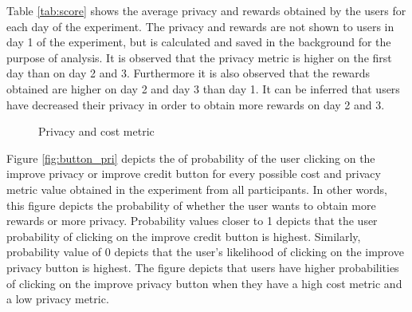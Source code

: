 Table \ref{tab:score} shows the average privacy and rewards obtained by the users for each day of the experiment. The privacy and rewards are not shown to users in day 1 of the experiment, but is calculated and saved in the background for the purpose of analysis. It is observed that the privacy metric is higher on the first day than on day 2 and 3. Furthermore it is also observed that the rewards obtained are higher on day 2 and day 3 than day 1.
It can be inferred that users have decreased their privacy in order to obtain more rewards on day 2 and 3.

\begin{figure}[htp]
\hspace{1em}
\caption{Privacy and cost metric}
\label{fig:st3}
\end{figure}

Figure \ref{fig:button_pri} depicts the of probability of the user clicking on the improve privacy or improve credit button for every possible cost and privacy metric value obtained in the experiment from all participants. In other words, this figure depicts the probability of whether the user wants to obtain more rewards or more privacy. Probability values closer to 1 depicts that the user probability of clicking on the improve credit button is highest. Similarly, probability value of 0 depicts that the user's likelihood of clicking on the improve privacy button is highest. The figure depicts that users have higher probabilities of clicking on the improve privacy button when they have a high cost metric and a low privacy metric.

